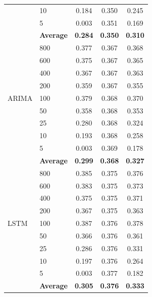 \documentclass[11pt,a4paper]{article}
\begin{document}
\begin{table}[H]
\begin{tabular}{llccc}
 & 10  & 0.184 & 0.350 & 0.245 \\
 & 5   & 0.003 & 0.351 & 0.169 \\
 & \textbf{Average} & \textbf{0.284} & \textbf{0.350} & \textbf{0.310} \\
\midrule
\multirow{9}{*}{ARIMA}
 & 800 & 0.377 & 0.367 & 0.368 \\
 & 600 & 0.375 & 0.367 & 0.365 \\
 & 400 & 0.367 & 0.367 & 0.363 \\
 & 200 & 0.359 & 0.367 & 0.355 \\
 & 100 & 0.379 & 0.368 & 0.370 \\
 & 50  & 0.358 & 0.368 & 0.353 \\
 & 25  & 0.280 & 0.368 & 0.324 \\
 & 10  & 0.193 & 0.368 & 0.258 \\
 & 5   & 0.003 & 0.369 & 0.178 \\
 & \textbf{Average} & \textbf{0.299} & \textbf{0.368} & \textbf{0.327} \\
\midrule
\multirow{9}{*}{LSTM}
 & 800 & 0.385 & 0.375 & 0.376 \\
 & 600 & 0.383 & 0.375 & 0.373 \\
 & 400 & 0.375 & 0.375 & 0.371 \\
 & 200 & 0.367 & 0.375 & 0.363 \\
 & 100 & 0.387 & 0.376 & 0.378 \\
 & 50  & 0.366 & 0.376 & 0.361 \\
 & 25  & 0.286 & 0.376 & 0.331 \\
 & 10  & 0.197 & 0.376 & 0.264 \\
 & 5   & 0.003 & 0.377 & 0.182 \\
 & \textbf{Average} & \textbf{0.305} & \textbf{0.376} & \textbf{0.333} \\
\bottomrule
\end{tabular}
\end{table}
\end{document}
